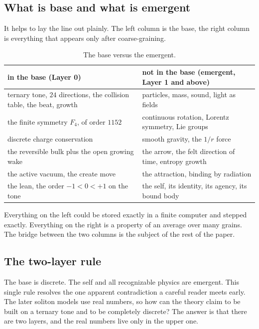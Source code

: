 \subsection{What is base and what is emergent}

It helps to lay the line out plainly. The left column is the base, the right column is everything that appears only after coarse-graining.

\begin{table}[ht]
\centering
\begin{tabular}{@{}p{}p{}@{}}
\toprule
in the base (Layer 0) & not in the base (emergent, Layer 1 and above) \\
\midrule
ternary tone, $24$ directions, the collision table, the beat, growth & particles, mass, sound, light as fields \\
the finite symmetry $F_4$, of order $1152$ & continuous rotation, Lorentz symmetry, Lie groups \\
discrete charge conservation & smooth gravity, the $1/r$ force \\
the reversible bulk plus the open growing wake & the arrow, the felt direction of time, entropy growth \\
the active vacuum, the create move & the attraction, binding by radiation \\
the lean, the order $-1 < 0 < +1$ on the tone & the self, its identity, its agency, its bound body \\
\bottomrule
\end{tabular}
\caption{The base versus the emergent.}
\label{tab:base-vs-emergent}
\end{table}

Everything on the left could be stored exactly in a finite computer and stepped exactly. Everything on the right is a property of an average over many grains. The bridge between the two columns is the subject of the rest of the paper.

\subsection{The two-layer rule}

The base is discrete. The self and all recognizable physics are emergent. This single rule resolves the one apparent contradiction a careful reader meets early. The later soliton models use real numbers, so how can the theory claim to be built on a ternary tone and to be completely discrete? The answer is that there are two layers, and the real numbers live only in the upper one.

